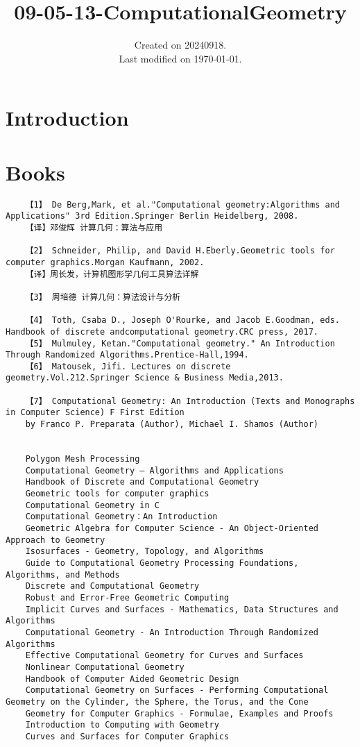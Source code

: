 \documentclass[UTF8]{../09-Mathematics}
\begin{document}
\title{09-05-13-ComputationalGeometry}
\date{Created on 20240918.\\   Last modified on \today.}
\maketitle
\tableofcontents


\chapter{Introduction}

\chapter{Books}

\begin{lstlisting}
    【1】 De Berg,Mark, et al."Computational geometry:Algorithms and Applications" 3rd Edition.Springer Berlin Heidelberg, 2008.
    【译】邓俊辉 计算几何：算法与应用
    
    【2】 Schneider, Philip, and David H.Eberly.Geometric tools for computer graphics.Morgan Kaufmann, 2002.
    【译】周长发，计算机图形学几何工具算法详解

    【3】 周培德 计算几何：算法设计与分析

    【4】 Toth, Csaba D., Joseph O'Rourke, and Jacob E.Goodman, eds. Handbook of discrete andcomputational geometry.CRC press, 2017.
    【5】 Mulmuley, Ketan."Computational geometry." An Introduction Through Randomized Algorithms.Prentice-Hall,1994.
    【6】 Matousek, Jifi. Lectures on discrete geometry.Vol.212.Springer Science & Business Media,2013.

    【7】 Computational Geometry: An Introduction (Texts and Monographs in Computer Science) F First Edition
    by Franco P. Preparata (Author), Michael I. Shamos (Author)

    
    Polygon Mesh Processing
    Computational Geometry – Algorithms and Applications
    Handbook of Discrete and Computational Geometry
    Geometric tools for computer graphics
    Computational Geometry in C
    Computational Geometry：An Introduction
    Geometric Algebra for Computer Science - An Object-Oriented Approach to Geometry
    Isosurfaces - Geometry, Topology, and Algorithms
    Guide to Computational Geometry Processing Foundations, Algorithms, and Methods
    Discrete and Computational Geometry
    Robust and Error-Free Geometric Computing
    Implicit Curves and Surfaces - Mathematics, Data Structures and Algorithms
    Computational Geometry - An Introduction Through Randomized Algorithms
    Effective Computational Geometry for Curves and Surfaces
    Nonlinear Computational Geometry
    Handbook of Computer Aided Geometric Design
    Computational Geometry on Surfaces - Performing Computational Geometry on the Cylinder, the Sphere, the Torus, and the Cone
    Geometry for Computer Graphics - Formulae, Examples and Proofs
    Introduction to Computing with Geometry
    Curves and Surfaces for Computer Graphics
    



    
\end{lstlisting}
\end{document}
